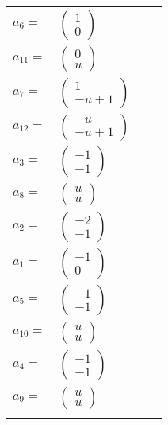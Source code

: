 \documentclass[1p]{elsarticle_modified}
\theoremstyle{definition}
\begin{document}
\begin{tabular}{m{7pt} m{180pt} m{7pt} m{180pt} }
\flushright $a_{6}=$&$\begin{pmatrix}1\\0\end{pmatrix}$ \\
\flushright $a_{11}=$&$\begin{pmatrix}0\\u\end{pmatrix}$ \\
\flushright $a_{7}=$&$\begin{pmatrix}1\\- u+1\end{pmatrix}$ \\
\flushright $a_{12}=$&$\begin{pmatrix}- u\\- u+1\end{pmatrix}$ \\
\flushright $a_{3}=$&$\begin{pmatrix}-1\\-1\end{pmatrix}$ \\
\flushright $a_{8}=$&$\begin{pmatrix}u\\u\end{pmatrix}$ \\
\flushright $a_{2}=$&$\begin{pmatrix}-2\\-1\end{pmatrix}$ \\
\flushright $a_{1}=$&$\begin{pmatrix}-1\\0\end{pmatrix}$ \\
\flushright $a_{5}=$&$\begin{pmatrix}-1\\-1\end{pmatrix}$ \\
\flushright $a_{10}=$&$\begin{pmatrix}u\\u\end{pmatrix}$ \\
\flushright $a_{4}=$&$\begin{pmatrix}-1\\-1\end{pmatrix}$ \\
\flushright $a_{9}=$&$\begin{pmatrix}u\\u\end{pmatrix}$\\&\end{tabular}
\end{document}
